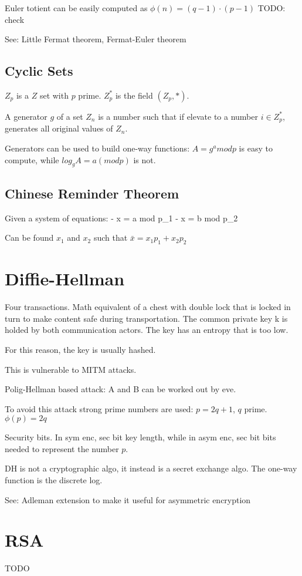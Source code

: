 Euler totient can be easily computed as $\phi(n) = (q-1) \cdot (p-1)$ TODO: check

See: Little Fermat theorem, Fermat-Euler theorem

\subsection{Cyclic Sets}
$Z_p$ is a $Z$ set with $p$ prime. $Z_p^*$ is the field $(Z_p, *)$.

A generator $g$ of a set $Z_n$ is a number such that if elevate to a number $i \in Z_p^*$, generates all original values of $Z_n$.

Generators can be used to build one-way functions: $A = g^a mod p$ is easy to compute, while $log_g A = a (mod p)$ is not.

\subsection{Chinese Reminder Theorem}
Given a system of equations:
 - x = a mod p_1
 - x = b mod p_2

Can be found $x_1$ and $x_2$ such that $\bar x = x_1 p_1 + x_2 p_2$

\section{Diffie-Hellman}
Four transactions. Math equivalent of a chest with double lock that is locked in turn to make content safe during transportation.
The common private key k is holded by both communication actors. The key has an entropy that is too low.

For this reason, the key is usually hashed.

This is vulnerable to MITM attacks.

Polig-Hellman based attack: A and B can be worked out by eve.

To avoid this attack strong prime numbers are used: $p = 2q+1$, $q$ prime. $\phi(p) = 2q$

Security bits. In sym enc, sec bit \approx key length, while in asym enc, sec bit \approx bits needed to represent the number $p$.

DH is not a cryptographic algo, it instead is a secret exchange algo.
The one-way function is the discrete log.

See: Adleman extension to make it useful for asymmetric encryption

\section{RSA}
TODO